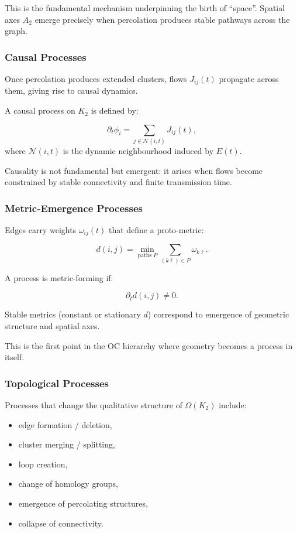 This is the fundamental mechanism underpinning the birth of “space”.
Spatial axes $A_2$ emerge precisely when percolation produces stable
pathways across the graph.

\subsubsection{Causal Processes}

Once percolation produces extended clusters, flows $J_{ij}(t)$ propagate
across them, giving rise to causal dynamics.

A causal process on $K_2$ is defined by:

\[
\partial_t \phi_i = \sum_{j \in \mathcal{N}(i,t)} J_{ij}(t),
\]
where $\mathcal{N}(i,t)$ is the dynamic neighbourhood induced by $E(t)$.

Causality is not fundamental but emergent:
it arises when flows become constrained by stable connectivity and finite
transmission time.

\subsubsection{Metric-Emergence Processes}

Edges carry weights $\omega_{ij}(t)$ that define a proto-metric:

\[
d(i,j) = \min_{\text{paths }P} \sum_{(k\ell)\in P} \omega_{k\ell}.
\]

A process is metric-forming if:

\[
\partial_t d(i,j) \neq 0.
\]

Stable metrics (constant or stationary $d$) correspond to emergence of
geometric structure and spatial axes.

This is the first point in the OC hierarchy where geometry becomes a
process in itself.

\subsubsection{Topological Processes}

Processes that change the qualitative structure of $\Omega(K_2)$ include:

\begin{itemize}
    \item edge formation / deletion,
    \item cluster merging / splitting,
    \item loop creation,
    \item change of homology groups,
    \item emergence of percolating structures,
    \item collapse of connectivity.
\end{itemize}

